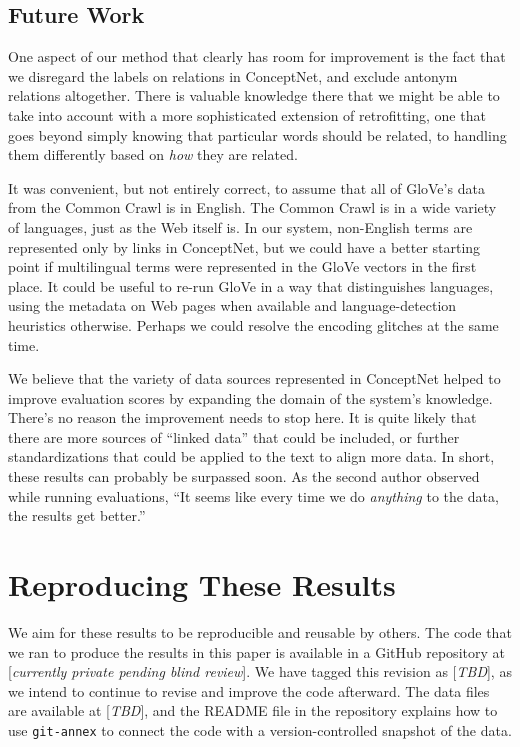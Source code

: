 \documentclass[letterpaper]{article}
\begin{document}
\subsection{Future Work}


One aspect of our method that clearly has room for improvement is the fact that
we disregard the labels on relations in ConceptNet, and exclude antonym
relations altogether. There is valuable knowledge there that we might be able
to take into account with a more sophisticated extension of retrofitting, one
that goes beyond simply knowing that particular words should be related, to
handling them differently based on {\em how} they are related.

It was convenient, but not entirely correct, to assume that all of GloVe's data
from the Common Crawl is in English. The Common Crawl is in a wide variety of
languages, just as the Web itself is. In our system, non-English terms are
represented only by links in ConceptNet, but we could have a better starting
point if multilingual terms were represented in the GloVe vectors in the first
place. It could be useful to re-run GloVe in a way that distinguishes languages,
using the metadata on Web pages when available and language-detection heuristics
otherwise. Perhaps we could resolve the encoding glitches at the same time.

We believe that the variety of data sources represented in ConceptNet helped to
improve evaluation scores by expanding the domain of the system's knowledge.
There's no reason the improvement needs to stop here. It is quite likely that
there are more sources of ``linked data'' that could be included, or further
standardizations that could be applied to the text to align more data. In
short, these results can probably be surpassed soon. As the second author
observed while running evaluations, ``It seems like every time we do {\em
anything} to the data, the results get better.''

\section{Reproducing These Results}

We aim for these results to be reproducible and reusable by others. The code
that we ran to produce the results in this paper is available in a GitHub
repository at [{\em currently private pending blind review}]. We have tagged
this revision as [{\em TBD}], as we intend to continue to revise and improve the
code afterward. The data files are available at [{\em TBD}], and the README file
in the repository explains how to use {\tt git-annex} to connect the code
with a version-controlled snapshot of the data.

\begin{CJK*}{UTF8}{min}

\end{CJK*}
\end{document}
